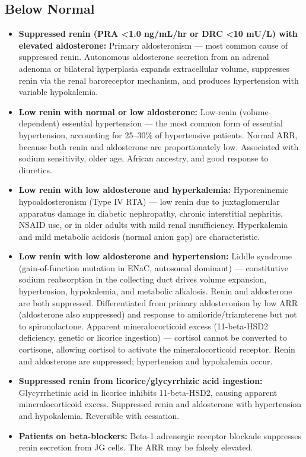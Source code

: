 \subsection*{Below Normal}
\begin{itemize}
  \item \textbf{Suppressed renin (PRA <1.0 ng/mL/hr or DRC <10 mU/L) with elevated aldosterone:} Primary aldosteronism --- most common cause of suppressed renin. Autonomous aldosterone secretion from an adrenal adenoma or bilateral hyperplasia expands extracellular volume, suppresses renin via the renal baroreceptor mechanism, and produces hypertension with variable hypokalemia.
  \item \textbf{Low renin with normal or low aldosterone:} Low-renin (volume-dependent) essential hypertension --- the most common form of essential hypertension, accounting for 25--30\% of hypertensive patients. Normal ARR, because both renin and aldosterone are proportionately low. Associated with sodium sensitivity, older age, African ancestry, and good response to diuretics.
  \item \textbf{Low renin with low aldosterone and hyperkalemia:} Hyporeninemic hypoaldosteronism (Type IV RTA) --- low renin due to juxtaglomerular apparatus damage in diabetic nephropathy, chronic interstitial nephritis, NSAID use, or in older adults with mild renal insufficiency. Hyperkalemia and mild metabolic acidosis (normal anion gap) are characteristic.
  \item \textbf{Low renin with low aldosterone and hypertension:} Liddle syndrome (gain-of-function mutation in ENaC, autosomal dominant) --- constitutive sodium reabsorption in the collecting duct drives volume expansion, hypertension, hypokalemia, and metabolic alkalosis. Renin and aldosterone are both suppressed. Differentiated from primary aldosteronism by low ARR (aldosterone also suppressed) and response to amiloride/triamterene but not to spironolactone. Apparent mineralocorticoid excess (11-beta-HSD2 deficiency, genetic or licorice ingestion) --- cortisol cannot be converted to cortisone, allowing cortisol to activate the mineralocorticoid receptor. Renin and aldosterone are suppressed; hypertension and hypokalemia occur.
  \item \textbf{Suppressed renin from licorice/glycyrrhizic acid ingestion:} Glycyrrhetinic acid in licorice inhibits 11-beta-HSD2, causing apparent mineralocorticoid excess. Suppressed renin and aldosterone with hypertension and hypokalemia. Reversible with cessation.
  \item \textbf{Patients on beta-blockers:} Beta-1 adrenergic receptor blockade suppresses renin secretion from JG cells. The ARR may be falsely elevated.
\end{itemize}


